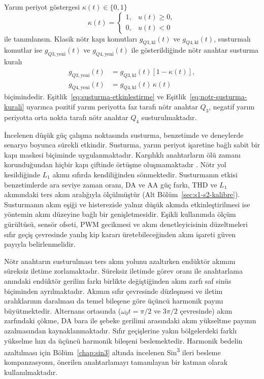 Yarım periyot göstergesi $\kappa(t)\in\{0,1\}$
\begin{equation}
  \kappa(t)=
  \begin{cases}
    1, & u(t)\geq0,\\
    0, & u(t)<0
  \end{cases}
  \label{eq:susturma-etkinlestirme}
\end{equation}
ile tanımlansın. Klasik nötr kapı komutları $g_{Q3,\mathrm{kl}}(t)$ ve $g_{Q4,\mathrm{kl}}(t)$, susturmalı komutlar ise $g_{Q3,\mathrm{yeni}}(t)$ ve $g_{Q4,\mathrm{yeni}}(t)$ ile gösterildiğinde nötr anahtar susturma kuralı
\begin{equation}
  \begin{aligned}
    g_{Q3,\mathrm{yeni}}(t) &= g_{Q3,\mathrm{kl}}(t)\left[1-\kappa(t)\right],\\
    g_{Q4,\mathrm{yeni}}(t) &= g_{Q4,\mathrm{kl}}(t)\,\kappa(t)
  \end{aligned}
  \label{eq:notr-susturma-kurali}
\end{equation}
biçimindedir. Eşitlik~\eqref{eq:susturma-etkinlestirme} ve Eşitlik~\eqref{eq:notr-susturma-kurali} uyarınca pozitif yarım periyotta faz tarafı nötr anahtar $Q_3$, negatif yarım periyotta orta nokta tarafı nötr anahtar $Q_4$ susturulmaktadır.

İncelenen düşük güç çalışma noktasında susturma, benzetimde ve deneylerde senaryo boyunca sürekli etkindir. Susturma, yarım periyot işaretine bağlı sabit bir kapı maskesi biçiminde uygulanmaktadır. Karşılıklı anahtarların ölü zamanı korunduğundan hiçbir kapı çiftinde örtüşme oluşmamaktadır \citep{Zhang2014Deadtime}. Nötr yol kesildiğinde $L_1$ akımı sıfırda kendiliğinden sönmektedir. Susturmanın etkisi benzetimlerde ara seviye zaman oranı, DA ve AA güç farkı, THD ve $L_1$ akımındaki ters akım aralığıyla ölçülmüştür (Alt Bölüm~\ref{sec:s1-s2-kalibre}). Susturmanın akım eşiği ve histerezisle yalnız düşük akımda etkinleştirilmesi ise yöntemin akım düzeyine bağlı bir genişletmesidir. Eşikli kullanımda ölçüm gürültüsü, sensör ofseti, PWM gecikmesi ve akım denetleyicisinin düzeltmeleri sıfır geçiş çevresinde yanlış kip kararı üretebileceğinden akım işareti güven payıyla belirlenmelidir.

Nötr anahtarın susturulması ters akım yolunu azaltırken endüktör akımını süreksiz iletime zorlamaktadır. Süreksiz iletimde görev oranı ile anahtarlama anındaki endüktör gerilim farkı birlikte değiştiğinden akım zarfı saf sinüs biçiminden ayrılmaktadır. Akımın sıfır çevresinde düzleşmesi ve iletim aralıklarının daralması da temel bileşene göre üçüncü harmonik payını büyütmektedir. Alternans ortasında ($\omega_0t=\pi/2$ ve $3\pi/2$ çevresinde) akım zarfındaki çökme, DA bara ile şebeke gerilimi arasındaki akım yükseltme payının azalmasından kaynaklanmaktadır. Sıfır geçişlerine yakın bölgelerdeki farklı yükselme hızı da üçüncü harmonik bileşeni beslemektedir. Harmonik bedelin azaltılması için Bölüm~\ref{chap:sin3} altında incelenen Sin\textsuperscript{3} ileri besleme kompanzasyonu, önerilen anahtarlamayı tamamlayan bir katman olarak kullanılmaktadır.

